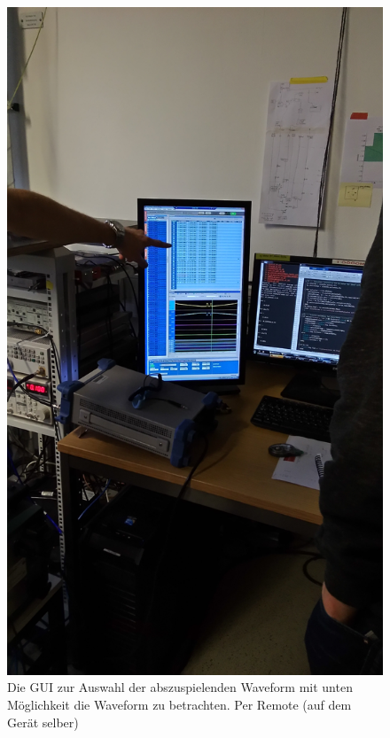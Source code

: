 \documentclass[DIN, pagenumber=false, fontsize=11pt]{scrartcl}
\begin{document}
\begin{figure}[h]
\begin{center}
 \includegraphics[width=\textheight, angle=270]{pictures/P_20150225_143613.jpg} \qquad
 \caption{Die GUI zur Auswahl der abszuspielenden Waveform mit unten Möglichkeit die Waveform zu betrachten. Per Remote (auf dem Gerät selber)}
\end{center}
\end{figure}          
\end{document}
